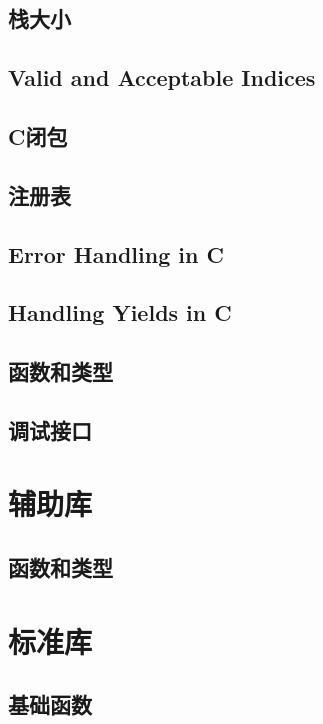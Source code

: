 \documentclass{ctexart}
\begin{document}
\subsection{栈大小}

\subsection{Valid and Acceptable Indices}

\subsection{C闭包}

\subsection{注册表}

\subsection{Error Handling in C}

\subsection{Handling Yields in C}

\subsection{函数和类型}

\subsection{调试接口}

\section{辅助库}

\subsection{函数和类型}

\section{标准库}

\subsection{基础函数}
\end{document}
